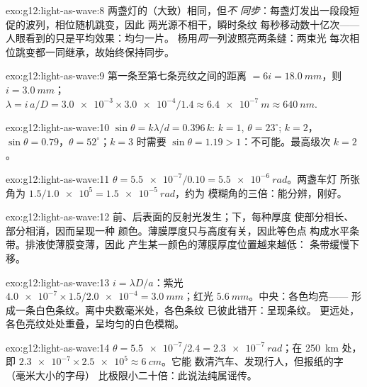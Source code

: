 \begin{solution}{exo:g12:light-as-wave:8}
两盏灯的（大致）相同，但\emph{不
同步}：每盏灯发出一段段短促的波列，相位随机跳变，因此
两光源不相干，瞬时条纹
每秒移动数十亿次——人眼看到的只是平均效果：均匀一片。
杨用\emph{同一}列波照亮两条缝：两束光
每次相位跳变都一同继承，故始终保持同步。
\end{solution}

\begin{solution}{exo:g12:light-as-wave:9}
第一条至第七条亮纹之间的距离 $= 6i = \qty{18.0}{mm}$，则 $i = \qty{3.0}{mm}$；
$\lambda = i\,a/D = \num{3.0e-3} \times \num{3.0e-4}/1.4 \approx
\qty{6.4e-7}{m} \approx \qty{640}{nm}$.
\end{solution}

\begin{solution}{exo:g12:light-as-wave:10}
$\sin\theta = k\lambda/d = 0.396\,k$: $k = 1$, $\theta = 23^\circ$;
$k = 2$，$\sin\theta = 0.79$，$\theta = 52^\circ$；$k = 3$ 时需要
$\sin\theta = 1.19 > 1$：不可能。最高级次 $k = 2$。
\end{solution}

\begin{solution}{exo:g12:light-as-wave:11}
$\theta = \num{5.5e-7}/0.10 = \qty{5.5e-6}{rad}$。两盏车灯
所张角为 $1.5/\num{1.0e5} = \qty{1.5e-5}{rad}$，约为
模糊角的三倍：能分辨，刚好。
\end{solution}

\begin{solution}{exo:g12:light-as-wave:12}
前、后表面的反射光发生；下，每种厚度
使部分相长、部分相消，因而呈现一种
颜色。薄膜厚度只与高度有关，因此等色点
构成水平条带。排液使薄膜变薄，因此
产生某一颜色的薄膜厚度位置越来越低：
条带缓慢下移。
\end{solution}

\begin{solution}{exo:g12:light-as-wave:13}
$i = \lambda D/a$：紫光 $\num{4.0e-7} \times 1.5/\num{2.0e-4} =
\qty{3.0}{mm}$；红光 $\qty{5.6}{mm}$。中央：各色均亮——
形成一条白色条纹。离中央数毫米处，各色条纹
已彼此错开：呈现条纹。
更远处，各色亮纹处处重叠，呈均匀的白色模糊。
\end{solution}

\begin{solution}{exo:g12:light-as-wave:14}
$\theta = \num{5.5e-7}/2.4 = \qty{2.3e-7}{rad}$；在 \qty{250}{km}
处，即 $\num{2.3e-7} \times \num{2.5e5} \approx \qty{6}{cm}$。它能
数清汽车、发现行人，但报纸的字（毫米大小的字母）
比极限小二十倍：此说法纯属谣传。
\end{solution}

